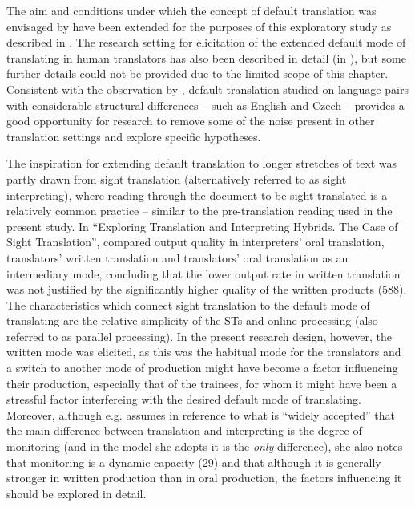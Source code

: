\documentclass[output=paper]{langscibook}
\begin{document}
The aim and conditions under which the concept of default translation was envisaged by \citet{Halverson2019} have been extended for the purposes of this exploratory study as described in . The research setting for elicitation of the extended default mode of translating in human translators has also been described in detail (in ), but some further details could not be provided due to the limited scope of this chapter. Consistent with the observation by \citet[204]{Halverson2019}, default translation studied on language pairs with considerable structural differences – such as English and Czech – provides a good opportunity for research to remove some of the noise present in other translation settings and explore specific hypotheses.

The inspiration for extending default translation to longer stretches of text was partly drawn from sight translation (alternatively referred to as sight interpreting), where reading through the document to be sight-translated is a relatively common practice – similar to the pre-translation reading used in the present study. In “Exploring Translation and Interpreting Hybrids. The Case of Sight Translation”, \citet{DragstedHansen2009} compared output quality in interpreters’ oral translation, translators’ written translation and translators’ oral translation as an intermediary mode, concluding that the lower output rate in written translation was not justified by the significantly higher quality of the written products (588). The characteristics which connect sight translation to the default mode of translating are the relative simplicity of the STs and online processing (also referred to as parallel processing). In the present research design, however, the written mode was elicited, as this was the habitual mode for the translators and a switch to another mode of production might have become a factor influencing their production, especially that of the trainees, for whom it might have been a stressful factor interfereing with the desired default mode of translating. Moreover, although e.g. \citet[31]{Oster2017} assumes in reference to what is “widely accepted” that the main difference between translation and interpreting is the degree of monitoring (and in the model she adopts it is the \textit{only} difference), she also notes that monitoring is a dynamic capacity (29) and that although it is generally stronger in written production than in oral production, the factors influencing it should be explored in detail.
\end{document}
